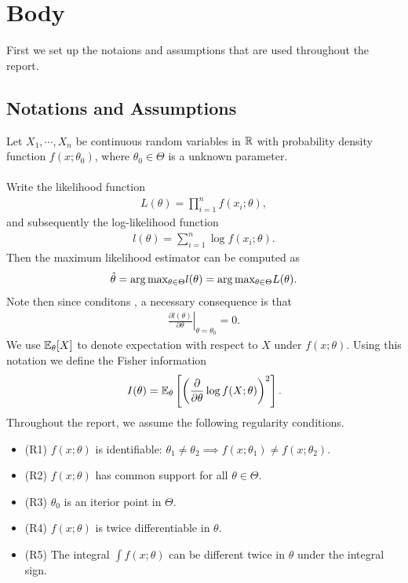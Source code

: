 
\section{Body}
First we set up the notaions and assumptions that are used throughout the report.
\subsection{Notations and Assumptions}
Let $X_1,\cdots,X_n$ be \iid continuous random variables in $\mathbb{R}$ with probability density function $f(x;\theta_0)$, where $\theta_0 \in \Theta$ is a unknown parameter.\\\\
Write the likelihood function
\begin{align}
L(\theta) = \prod_{i=1}^n f(x_i;\theta),
\end{align}
and subsequently the log-likelihood function
\begin{align}
l(\theta) = \sum_{i=1}^n \log f(x_i;\theta).
\end{align}
Then the maximum likelihood estimator can be computed as
\begin{align}
\hat{\theta} = \arg\text{max}_{\theta\in\Theta}l(\theta) = \arg\text{max}_{\theta\in\Theta}L(\theta).
\end{align}
Note then since \bred conditons \ered, a necessary consequence is that
\begin{align}
\left.\frac{\partial l(\theta)}{\partial \theta} \right\vert_{\theta=\theta_0} = 0.
\end{align}
We use $\mathbb{E}_{\theta}[X]$ to denote expectation with respect to $X$ under $f(x;\theta)$. Using this notation we define the Fisher information
\begin{align}
I(\theta) = \mathbb{E}_{\theta}\left[ \left( \frac{\partial}{\partial\theta}\log f(X;\theta) \right)^2 \right]. \label{eqn:fisher}
\end{align}
Throughout the report, we assume the following regularity conditions.
\begin{itemize}
\item (R1) $f(x;\theta)$ is identifiable: $\theta_1\neq\theta_2\implies f(x;\theta_1)\neq f(x;\theta_2)$.
\item (R2) $f(x;\theta)$ has common support for all $\theta\in\Theta$.
\item (R3) $\theta_0$ is an iterior point in $\Theta$.
\item (R4) $f(x;\theta)$ is twice differentiable in $\theta$.
\item (R5) The integral $\int f(x;\theta)$ can be different twice in $\theta$ under the integral sign.
\end{itemize}


